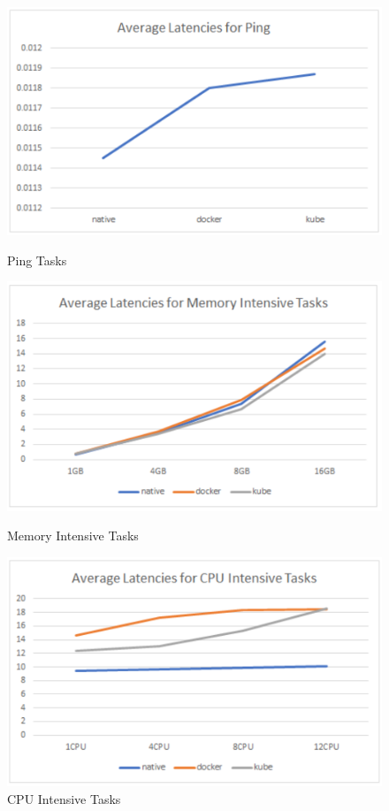 \documentclass[sigconf]{acmart}
\begin{document}
\begin{figure}[ht] 
  \label{simple} 
  \begin{minipage}[b]{0.33\linewidth}
    \centering
    \includegraphics[width=.8\linewidth]{figures/ping.png} 
    \caption{Ping Tasks} 
    \vspace{4ex}
  \end{minipage}%
  \begin{minipage}[b]{0.33\linewidth}
    \centering
    \includegraphics[width=.8\linewidth]{figures/mem.png} 
    \caption{Memory Intensive Tasks} 
    \vspace{4ex}
  \end{minipage}%
  \begin{minipage}[b]{0.33\linewidth}
    \centering
    \includegraphics[width=.8\linewidth]{figures/CPU.png} 
    \caption{CPU Intensive Tasks} 
    \vspace{4ex}
  \end{minipage}
\end{figure}
\end{document}

